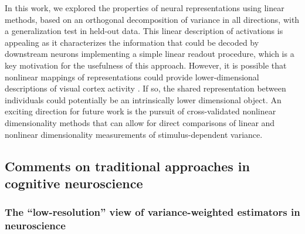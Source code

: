 \documentclass[10pt]{article}
\begin{document}
In this work, we explored the properties of neural representations using
linear methods, based on an orthogonal decomposition of variance in all
directions, with a generalization test in held-out data. This linear
description of activations is appealing as it characterizes the
information that could be decoded by downstream neurons implementing a
simple linear readout procedure, which is a key motivation for the
usefulness of this approach. However, it is possible that nonlinear
mappings of representations could provide lower-dimensional descriptions
of visual cortex activity \autocite{Ansuini2019,De2023,Jazayeri2021}. If
so, the shared representation between individuals could potentially be
an intrinsically lower dimensional object. An exciting direction for
future work is the pursuit of cross-validated nonlinear dimensionality
methods that can allow for direct comparisons of linear and nonlinear
dimensionality measurements of stimulus-dependent variance.

\subsection{Comments on traditional approaches in cognitive
neuroscience}\label{comments-on-traditional-approaches-in-cognitive-neuroscience}

\subsubsection{The ``low-resolution'' view of variance-weighted
estimators in
neuroscience}\label{the-low-resolution-view-of-variance-weighted-estimators-in-neuroscience}
\end{document}
